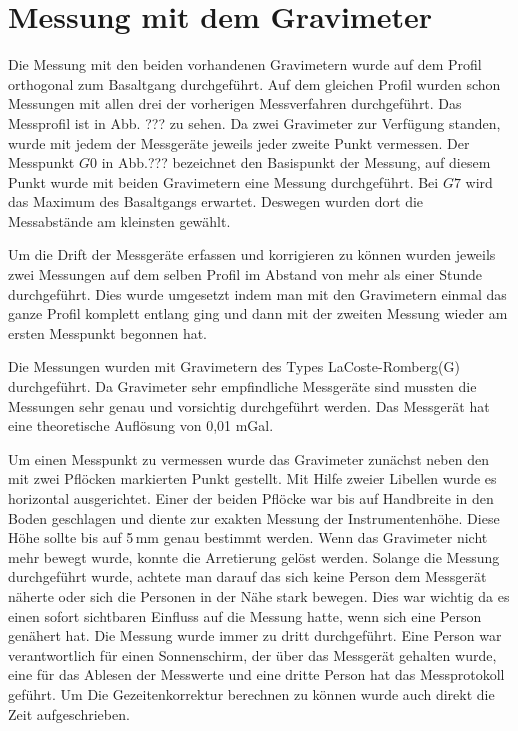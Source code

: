 \section{Messung mit dem Gravimeter}
Die Messung mit den beiden vorhandenen Gravimetern wurde auf dem Profil orthogonal zum Basaltgang durchgeführt. Auf dem gleichen Profil wurden schon Messungen mit allen drei der vorherigen Messverfahren durchgeführt.
Das Messprofil ist in Abb. ??? zu sehen. Da zwei Gravimeter zur Verfügung standen, wurde mit jedem der Messgeräte jeweils jeder zweite Punkt vermessen. Der Messpunkt $G0$ in Abb.??? bezeichnet den Basispunkt der Messung, auf
diesem Punkt wurde mit beiden Gravimetern eine Messung durchgeführt. Bei $G7$ wird das Maximum des Basaltgangs erwartet. Deswegen wurden dort die Messabstände am kleinsten gewählt.

Um die Drift der Messgeräte erfassen und korrigieren zu können wurden jeweils zwei Messungen auf dem selben Profil im Abstand von mehr als einer Stunde durchgeführt. Dies wurde umgesetzt indem man mit den Gravimetern 
einmal das ganze Profil komplett entlang ging und dann mit der zweiten Messung wieder am ersten Messpunkt begonnen hat.

Die Messungen wurden mit Gravimetern des Types LaCoste-Romberg(G) durchgeführt. Da Gravimeter sehr empfindliche Messgeräte sind mussten die Messungen sehr genau und vorsichtig durchgeführt werden. Das Messgerät hat eine 
theoretische Auflösung von 0,01 mGal.

Um einen Messpunkt zu vermessen wurde das Gravimeter zunächst neben den mit zwei Pflöcken markierten Punkt gestellt. Mit Hilfe zweier Libellen wurde es horizontal ausgerichtet. Einer der beiden Pflöcke 
war bis auf Handbreite in den Boden geschlagen und diente zur exakten Messung der Instrumentenhöhe. Diese Höhe sollte bis auf 5\,mm genau bestimmt werden.
Wenn das Gravimeter nicht mehr bewegt wurde, konnte die Arretierung gelöst werden. Solange die Messung durchgeführt wurde, achtete man darauf das sich keine Person dem Messgerät näherte oder sich die Personen in der 
Nähe stark bewegen. Dies war wichtig da es einen sofort sichtbaren Einfluss auf die Messung hatte, wenn sich eine Person genähert hat.
Die Messung wurde immer zu dritt durchgeführt. Eine Person war verantwortlich für einen Sonnenschirm, der über das Messgerät gehalten wurde, eine für das Ablesen der Messwerte 
und eine dritte Person hat das Messprotokoll geführt. Um Die Gezeitenkorrektur berechnen zu können wurde auch direkt die Zeit aufgeschrieben.


